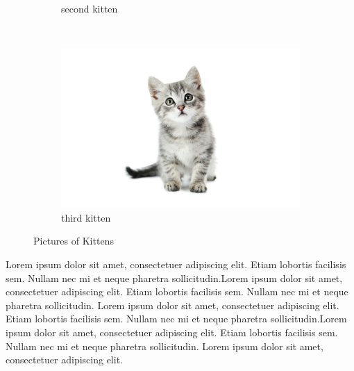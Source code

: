 \documentclass[12pt]{article}
\begin{document}
\begin{figure}[!b]
\begin{subfigure}[b]{0.3\textwidth}
        \caption{second kitten}
        \label{fig:tiger}
    \end{subfigure}
    ~ %
    \begin{subfigure}[b]{0.3\textwidth}
        \includegraphics[width=\textwidth]{./kitten4.jpg}
        \caption{third kitten}
        \label{fig:mouse}
    \end{subfigure}
    \caption{Pictures of Kittens}
    \label{fig:animals}
\end{figure}






\newpage


Lorem ipsum dolor sit amet, consectetuer adipiscing elit. 
Etiam lobortis facilisis sem. Nullam nec mi et neque pharetra sollicitudin.Lorem ipsum dolor sit amet, consectetuer adipiscing elit. Etiam lobortis facilisis sem. Nullam nec mi et neque pharetra sollicitudin. Lorem ipsum dolor sit amet, consectetuer adipiscing elit. 
Etiam lobortis facilisis sem. Nullam nec mi et neque pharetra sollicitudin.Lorem ipsum dolor sit amet, consectetuer adipiscing elit. Etiam lobortis facilisis sem. Nullam nec mi et neque pharetra sollicitudin. Lorem ipsum dolor sit amet, consectetuer adipiscing elit. 
\end{document}
